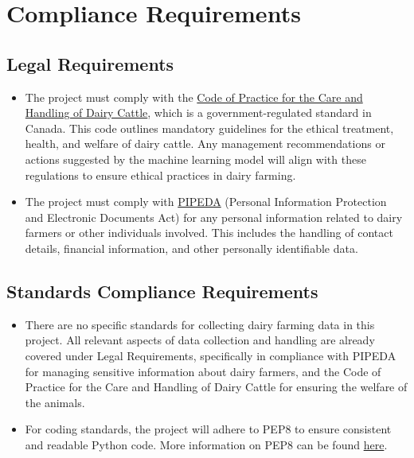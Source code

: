 \documentclass[12pt]{article}
\begin{document}
\section{Compliance Requirements}
\subsection{Legal Requirements}
\begin{itemize}
	\item The project must comply with the
	      \href{https://www.nfacc.ca/codes-of-practice/dairy-cattle}{Code of
	      Practice for the Care and Handling of Dairy Cattle}, which is a
	      government-regulated standard in Canada. This code outlines mandatory
	      guidelines for the ethical treatment, health, and welfare of dairy
	      cattle. Any management recommendations or actions suggested by the
	      machine learning model will align with these regulations to ensure
	      ethical practices in dairy farming.
	        
	\item The project must comply with
	      \href{https://laws-lois.justice.gc.ca/pdf/p-8.6.pdf}{PIPEDA} (Personal
	      Information Protection and Electronic Documents Act) for any personal
	      information related to dairy farmers or other individuals involved. 
          This includes the handling of contact details, financial information, 
          and other personally identifiable data.
\end{itemize}
\subsection{Standards Compliance Requirements}
\begin{itemize}
	\item There are no specific standards for collecting dairy farming data in
	      this project. All relevant aspects of data collection and handling are
	      already covered under Legal Requirements, specifically in compliance
	      with PIPEDA for managing sensitive information about dairy farmers, 
          and the Code of Practice for the Care and Handling of Dairy Cattle for
	      ensuring the welfare of the animals.
	\item For coding standards, the project will adhere to PEP8 to ensure
	      consistent and readable Python code. More information on PEP8 can be
	      found \href{https://peps.python.org/pep-0008/}{here}.
\end{itemize}
\end{document}
